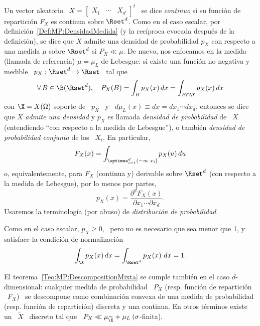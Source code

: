 \begin{definicion}
\label{Def:MP:VectorAleatorioContinuo}
%
Un vector aleatorio \ $X = \begin{bmatrix} X_1 & \cdots & X_d \end{bmatrix}^t$ \
se dice {\it continuo} si su  funci\'on de repartici\'on $F_X$ es continua sobre
$\Rset^d$.         Como       en        el        caso       escalar,        por
definici\'on~\ref{Def:MP:DensidadMedida} (y la  rec\'iproca evocada despu\'es de
la definici\'on), se dice que $X$  admite una densidad de probabilidad $p_X$ con
respecto a  una medida $\mu$  sobre $\Rset^d$ si  $P_X \ll \mu$.  De  nuevo, nos
enfocamos en  la medida (llamada  de referencia) $\mu  = \mu_L$ de  Lebesgue: si
existe una funci\'on no negativa y  medible \ $p_X: \Rset^d \mapsto \Rset$ \ tal
que
  \[
  \forall \,  B \in \B(\Rset^d),  \quad P_X(B) =  \int_B p_X(x) \, dx  = \int_{B
    \cap \X} p_X(x) \, dx
  \]
  con $\X  = X(\Omega)$ soporte  de \ $p_X$  \ y \  $d\mu_L(x) \equiv dx  = dx_1
  \cdots dx_d$,  entonces se dice que $X$  {\it admite una densidad}  y $p_X$ es
  llamada {\it densidad de probabilidad}  de \ $X$ (entendiendo ``con respecto a
  la medida de Lebesgue''), o  tambi\'en {\it densidad de probabilidad conjunta}
  de los \ $X_i$. En particular,
  \[
  F_X(x) =  \int_{\optimes_{i=1}^d (-\infty \; x_i]} p_X(u) \, du
  \]
  o, equivalentemente,  para $F_X$ (continua  y) derivable sobre  $\Rset^d$ (con
  respecto a la medida de Lebesgue), por lo menos por partes,
  \[
  p_X(x) = \frac{\partial^d F_X(x)}{\partial x_1 \cdots \partial x_d}.
  \]
  Usaremos   la   terminolog\'ia  (por   abuso)   de   {\it  distribuci\'on   de
    probabilidad}.
\end{definicion}

Como en el caso  escalar, $p_X \ge 0$, \ pero no es  necesario que sea menor que
1, y satisface la condici\'on de normalizaci\'on
%
\[
\int_\X p_X(x) \, dx = \int_{\Rset^d} p_X(x) \ dx  = 1.
\]

El  teorema~\ref{Teo:MP:DescompositionMixta}  se  cumple  tambi\'en en  el  caso
$d$-dimensional: cualquier  medida de probabilidad \ $P_X$  (resp.  funci\'on de
repartici\'on \ $F_X$) \ se  descompone como combinaci\'on convexa de una medida
de probabilidad (resp.  funci\'on de repartici\'on) discreta y una continua.  En
otros  t\'erminos existe  un \  $\widetilde{X}$ \  discreto tal  que \  $P_X \ll
\mu_{\widetilde{\X}} + \mu_L \: (\sigma$-finita).

